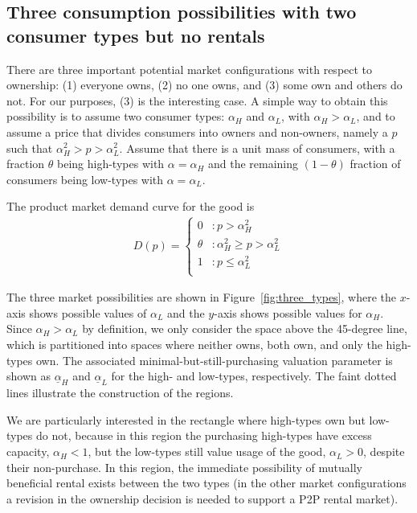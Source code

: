 \documentclass[11pt]{article}
\begin{document}
\subsection{Three consumption possibilities with two consumer types but no rentals} 
There are three important potential market configurations with respect to ownership:
(1) everyone owns, (2) no one owns, and (3) some own and others do not.
For our purposes, (3) is the interesting case.
A simple way to obtain this possibility is to assume two consumer
types: $\alpha_H$ and $\alpha_L$, with $\alpha_H > \alpha_L$, and to assume a price that divides consumers into owners and non-owners, namely a $p$ such that $\alpha_H^2 > p > \alpha_L^2$.
Assume that there is a unit mass of consumers, with a fraction $\theta$ being high-types with $\alpha = \alpha_H$ and the remaining $(1-\theta)$ fraction of consumers being low-types with $\alpha = \alpha_L$. 

The product market demand curve for the good is 
\begin{align} \label{eq:demand}
   D(p) = \left\{
     \begin{array}{ll}
       0 & : p > \alpha_H^2\\
       \theta & : \alpha_H^2 \ge p > \alpha_L^2  \\
       1 & : p \le \alpha_L^2  \\
     \end{array}
   \right. 
\end{align} 

The three market possibilities are shown in Figure~\ref{fig:three_types}, where the $x$-axis shows possible values of $\alpha_L$ and the $y$-axis shows possible values for $\alpha_H$.
Since $\alpha_H > \alpha_L$ by definition, we only consider the space above the 45-degree line, which is partitioned into spaces where neither owns, both own, and only the high-types own. 
The associated minimal-but-still-purchasing valuation parameter is shown as $\underline{\alpha}_H$ and $\underline{\alpha}_L$ for the high- and low-types, respectively. 
The faint dotted lines illustrate the construction of the regions.

We are particularly interested in the rectangle where high-types own but low-types do not, because in this region the purchasing high-types have excess capacity, $\alpha_H < 1$, but the low-types still value usage of the good, $\alpha_L > 0$, despite their non-purchase. 
In this region, the immediate possibility of mutually beneficial rental exists between the two types (in the other market configurations a revision in the ownership decision is needed to support a P2P rental market). 
\end{document}
